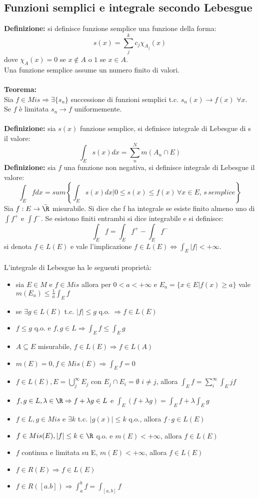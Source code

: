 \documentclass{article}
\begin{document}
\subsection{Funzioni semplici e integrale secondo Lebesgue}
\textbf{Definizione:} si definisce funzione semplice una funzione della forma:
$$ s(x)=\sum_j^k c_j\chi_{A_j}(x) $$
dove $\chi_A(x)=0$ se $x\notin A$ o $1$ se $x\in A$.\\
Una funzione semplice assume un numero finito di valori.\\\\
\textbf{Teorema:}\\
Sia $f\in Mis\Rightarrow\exists\{s_n\}$ successione di funzioni semplici t.c. $s_n(x)\rightarrow f(x)$ $\forall x$. Se $f$ è limitata $s_n\rightarrow f$ uniformemente.\\\\
\textbf{Definizione:} sia $s(x)$ funzione semplice, si definisce integrale di Lebesgue di s il valore:
$$ \int_Es(x)dx=\sum_n^Nm(A_n\cap E) $$
\textbf{Definizione:} sia $f$ una funzione non negativa, si definisce integrale di Lebesgue il valore:
$$ \int_Efdx=sum\left\{\int_Es(x)dx|0\leq s(x)\leq f(x)\,\forall x\in E,\,s\,semplice\right\} $$
Sia $f:E\rightarrow\bar{\R}$ misurabile. Si dice che f ha integrale se esiste finito almeno uno di $\int f^+$ e $\int f^-$. Se esistono finiti entrambi si dice integrabile e si definisce:
$$ \int_E f=\int_E f^+-\int_Ef^-$$
si denota $f\in L(E)$ e vale l'implicazione $f\in L(E)\Leftrightarrow\int_E|f|<+\infty$.\\\\
L'integrale di Lebesgue ha le seguenti proprietà:
\begin{itemize}
    \item sia $E\in M$ e $f\in Mis$ allora per $0<a<+\infty$ e $E_a=\{x\in E|f(x)\geq a\}$ vale $m(E_a)\leq\frac{1}{a}\int_Ef$
    \item se $\exists g\in L(E)$ t.c. $|f|\leq g$ q.o. $\Rightarrow f\in L(E)$
    \item $f\leq g$ q.o. e $f,g\in L\Rightarrow\int_Ef\leq\int_Eg$
    \item $A\subseteq E$ misurabile, $f\in L(E)\Rightarrow f\in L(A)$
    \item $m(E)=0, f\in Mis(E)\Rightarrow\int_Ef=0$
    \item $f\in L(E), E=\bigcup_j^\infty E_j$ con $E_j\cap E_i=\emptyset$ $i\neq j$, allora $\int_Ef=\sum_i^\infty\int_Ej f$ 
    \item $f,g\in L, \lambda\in\R\Rightarrow f+\lambda g\in L$ e $\int_E(f+\lambda g)=\int_Ef+\lambda\int_Eg$
    \item $f\in L,g\in Mis$ e $\exists k$ t.c. $|g(x)|\leq k$ q.o., allora $f\cdot g\in L(E)$
    \item $f\in Mis(E),|f|\leq k\in\R$ q.o. e $m(E)<+\infty$, allora $f\in L(E)$
    \item $f$ continua e limitata su E, $m(E)<+\infty$, allora $f\in L(E)$
    \item $f\in R(E)\Rightarrow f\in L(E)$
    \item $f\in R([a.b])\Rightarrow \int_a^bf=\int_{[a,b]}f$
\end{itemize}
\end{document}
